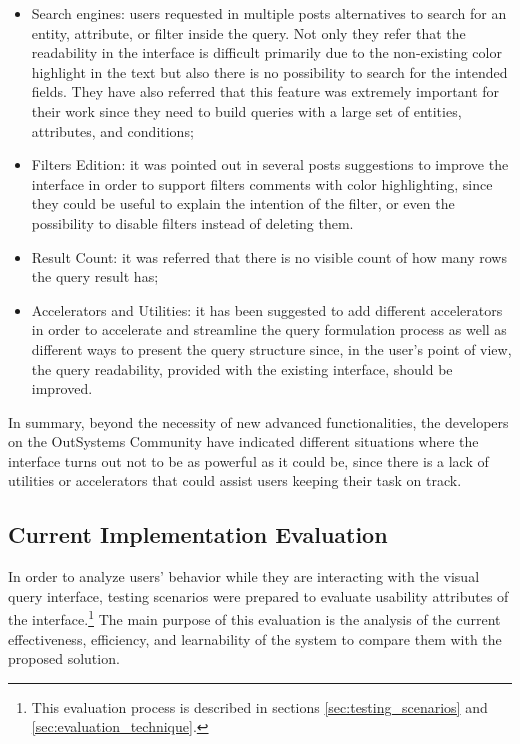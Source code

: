 \begin{itemize}
    \item Search engines: users requested in multiple posts alternatives to search for an entity, attribute, or filter inside the query. Not only they refer that the readability in the interface is difficult primarily due to the non-existing color highlight in the text but also there is no possibility to search for the intended fields. They have also referred that this feature was extremely important for their work since they need to build queries with a large set of entities, attributes, and conditions;
    \item Filters Edition: it was pointed out in several posts suggestions to improve the interface in order to support filters comments with color highlighting, since they could be useful to explain the intention of the filter, or even the possibility to disable filters instead of deleting them.  
    \item Result Count: it was referred that there is no visible count of how many rows the query result has;
    \item Accelerators and Utilities: it has been suggested to add different accelerators in order to accelerate and streamline the query formulation process as well as different ways to present the query structure since, in the user's point of view, the query readability, provided with the existing interface, should be improved.
\end{itemize}

In summary, beyond the necessity of new advanced functionalities, the developers on the OutSystems Community have indicated different situations where the interface turns out not to be as powerful as it could be, since there is a lack of utilities or accelerators that could assist users keeping their task on track.

\subsection{Current Implementation Evaluation}
\label{sec:current_implementation_evaluation}

In order to analyze users' behavior while they are interacting with the visual query interface, testing scenarios were prepared to evaluate usability attributes of the interface.\footnote{This evaluation process is described in sections \ref{sec:testing_scenarios} and \ref{sec:evaluation_technique}.} The main purpose of this evaluation is the analysis of the current effectiveness, efficiency, and learnability of the system to compare them with the proposed solution. 

